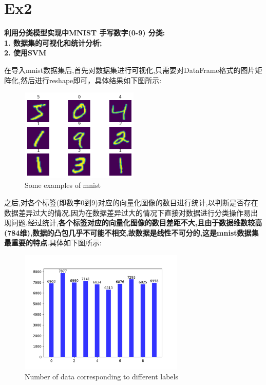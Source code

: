 \documentclass[UTF8,a4paper,11pt]{ctexart}
\begin{document}
\section{Ex2}
\textbf{利用分类模型实现中MNIST 手写数字(0-9) 分类:\\
1. 数据集的可视化和统计分析;\\
2. 使用SVM}\\
\par 在导入mnist数据集后,首先对数据集进行可视化,只需要对DataFrame格式的图片矩阵化,然后进行reshape即可，具体结果如下图所示:
\begin{figure}[H]
	\centering
	\includegraphics[width=0.5\textwidth,height=0.5\textwidth]{mnist_example.png}
	\caption{Some examples of mnist}
\end{figure}
\par 之后,对各个标签(即数字0到9)对应的向量化图像的数目进行统计,以判断是否存在数据差异过大的情况,因为在数据差异过大的情况下直接对数据进行分类操作易出现问题.经过统计,\textbf{各个标签对应的向量化图像的数目差距不大,且由于数据维数较高(784维),数据的凸包几乎不可能不相交,故数据是线性不可分的,这是mnist数据集最重要的特点}.具体如下图所示:
\begin{figure}[H]
	\centering
	\includegraphics[width=0.7\textwidth,height=0.5\textwidth]{2.png}
	\caption{Number of data corresponding to different labels}
\end{figure}
\end{document}
